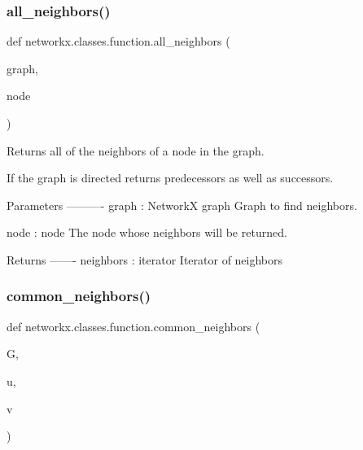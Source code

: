 \subsubsection{\texorpdfstring{all\+\_\+neighbors()}{all\_neighbors()}}
{\footnotesize\ttfamily def networkx.\+classes.\+function.\+all\+\_\+neighbors (\begin{DoxyParamCaption}\item[{}]{graph,  }\item[{}]{node }\end{DoxyParamCaption})}

\begin{DoxyVerb}Returns all of the neighbors of a node in the graph.

If the graph is directed returns predecessors as well as successors.

Parameters
----------
graph : NetworkX graph
    Graph to find neighbors.

node : node
    The node whose neighbors will be returned.

Returns
-------
neighbors : iterator
    Iterator of neighbors
\end{DoxyVerb}
 \mbox{\label{namespacenetworkx_1_1classes_1_1function_ae1b9811bc09def6b6a4e6fda86b49df9}} 
\subsubsection{\texorpdfstring{common\+\_\+neighbors()}{common\_neighbors()}}
{\footnotesize\ttfamily def networkx.\+classes.\+function.\+common\+\_\+neighbors (\begin{DoxyParamCaption}\item[{}]{G,  }\item[{}]{u,  }\item[{}]{v }\end{DoxyParamCaption})}

